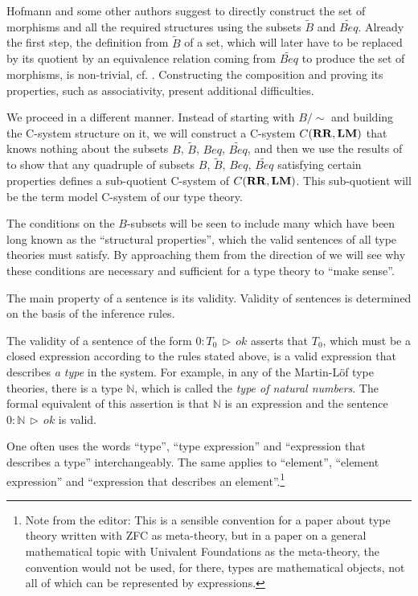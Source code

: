 \documentclass[12pt]{amsart}
\numberwithin{proposition}{subsection}
\newcommand{\nn}{{\mathbb N}}
\newcommand{\nat}{\nn}
\newcommand{\wt}{\widetilde}
\newcommand{\RR}{{\bf RR}}
\newcommand{\LM}{{\bf LM}}
\DeclareMathOperator{\rh}{\,\rhd\,}
\newcommand{\editorfootnote}[1]{\footnote{Note from the editor: #1}}
\begin{document}
Hofmann and some other authors suggest to directly construct the set of
morphisms and all the required structures using the subsets $\wt{B}$ and
$\wt{Beq}$. Already the first step, the definition from $\wt{B}$ of a set, which
will later have to be replaced by its quotient by an equivalence relation coming from
$\wt{Beq}$ to produce the set of morphisms, is non-trivial, cf.{} \cite[Def. 2.11,
  p.~97]{Hofmann}. Constructing the composition and proving its properties, such
as associativity, present additional difficulties.

We proceed in a different manner. Instead of starting with $B/{\sim}$ and
building the C-system structure on it, we will construct a C-system
$C(\RR,\LM)$ that knows nothing about the subsets
$B$, $\wt{B}$, $Beq$, $\wt{Beq}$, and then we use the results of \cite{Csubsystems}
to show that any quadruple of subsets $B$, $\wt{B}$, $Beq$, $\wt{Beq}$ satisfying
certain properties defines a sub-quotient C-system of $C(\RR,\LM)$. This
sub-quotient will be the term model C-system of our type theory.

The conditions on the $B$-subsets will be seen to include many
which have been long known as the ``structural properties'', which the valid
sentences of all type theories must satisfy. By approaching them from the
direction of \cite{Csubsystems} we will see why these conditions are
necessary and sufficient for a type theory to ``make sense''.

The main property of a sentence is its validity. Validity of sentences is
determined on the basis of the inference rules.

The validity of a sentence of the form $0:T_0\rh ok$ asserts that $T_0$, which
must be a closed expression according to the rules stated above, is a valid
expression that describes {\em a type} in the system. For example, in any of
the Martin-L\"{o}f type theories, there is a type $\nat$, which is called the
{\em type of natural numbers}. The formal equivalent of this assertion is that $\nat$
is an expression and the sentence $0:\nat\rh ok$ is valid.

One often uses the words ``type'', ``type expression'' and ``expression that
describes a type'' interchangeably. The same applies to ``element'', ``element
expression'' and ``expression that describes an element''.\editorfootnote{
  This is a sensible convention for a paper about type theory
  written with ZFC as meta-theory, but in a paper on a general mathematical
  topic with Univalent Foundations as the meta-theory, the convention would not
  be used, for there, types are mathematical objects, not all of which can be
  represented by expressions.}
\end{document}
